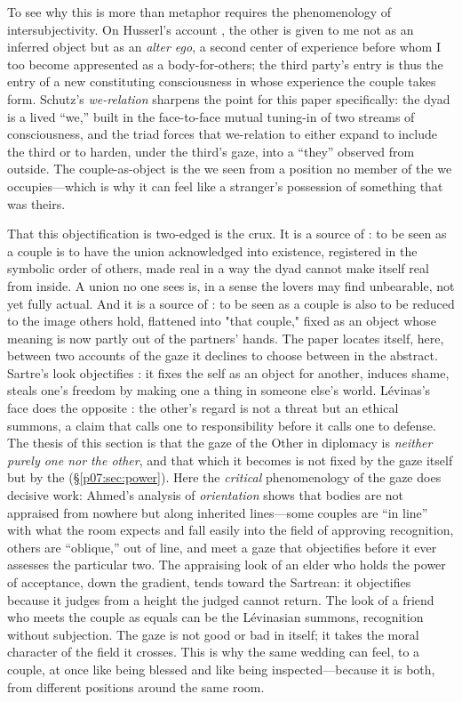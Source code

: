 \documentclass[11pt,a4paper]{article}
\newcommand{\emb}[1]{\textcolor{rose}{\oldtextbf{#1}}}
\newcommand{\xref}[1]{\textcolor{rose}{\S\ref{#1}}}
\begin{document}
To see why this is more than metaphor requires the phenomenology of intersubjectivity. On Husserl's account \parencite{husserl1931cm}, the other is given to me not as an inferred object but as an \emph{alter ego}, a second center of experience before whom I too become appresented as a body-for-others; the third party's entry is thus the entry of a new constituting consciousness in whose experience the couple takes form. Schutz's \emph{we-relation} \parencite{schutz1932} sharpens the point for this paper specifically: the dyad is a lived ``we,'' built in the face-to-face mutual tuning-in of two streams of consciousness, and the triad forces that we-relation to either expand to include the third or to harden, under the third's gaze, into a ``they'' observed from outside. The couple-as-object is the we seen from a position no member of the we occupies---which is why it can feel like a stranger's possession of something that was theirs.

That this objectification is two-edged is the crux. It is a source of \emb{recognition}: to be seen as a couple is to have the union acknowledged into existence, registered in the symbolic order of others, made real in a way the dyad cannot make itself real from inside. A union no one sees is, in a sense the lovers may find unbearable, not yet fully actual. And it is a source of \emb{alienation}: to be seen as a couple is also to be reduced to the image others hold, flattened into "that couple," fixed as an object whose meaning is now partly out of the partners' hands. The paper locates itself, here, between two accounts of the gaze it declines to choose between in the abstract. Sartre's look objectifies \parencite{sartre1943}: it fixes the self as an object for another, induces shame, steals one's freedom by making one a thing in someone else's world. Lévinas's face does the opposite \parencite{levinas1961}: the other's regard is not a threat but an ethical summons, a claim that calls one to responsibility before it calls one to defense. The thesis of this section is that the gaze of the Other in diplomacy is \emph{neither purely one nor the other}, and that which it becomes is not fixed by the gaze itself but by the \emb{structure within which it falls} (\xref{p07:sec:power}). Here the \emph{critical} phenomenology of the gaze does decisive work: Ahmed's analysis of \emph{orientation} \parencite{ahmed2006queer} shows that bodies are not appraised from nowhere but along inherited lines---some couples are ``in line'' with what the room expects and fall easily into the field of approving recognition, others are ``oblique,'' out of line, and meet a gaze that objectifies before it ever assesses the particular two. The appraising look of an elder who holds the power of acceptance, down the gradient, tends toward the Sartrean: it objectifies because it judges from a height the judged cannot return. The look of a friend who meets the couple as equals can be the Lévinasian summons, recognition without subjection. The gaze is not good or bad in itself; it takes the moral character of the field it crosses. This is why the same wedding can feel, to a couple, at once like being blessed and like being inspected---because it is both, from different positions around the same room.
\end{document}
